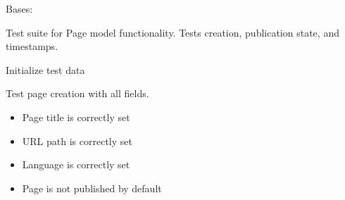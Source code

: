 \documentclass[letterpaper,10pt,english]{sphinxmanual}
\begin{document}
\begin{fulllineitems}
\label{\detokenize{pages_app.tests:pages_app.tests.test_models.PageModelTest}}
\pysigstartsignatures
\pysiglinewithargsret
{}
{}
{}
\pysigstopsignatures
\sphinxAtStartPar
Bases: 

\sphinxAtStartPar
Test suite for Page model functionality.
Tests creation, publication state, and timestamps.

\begin{fulllineitems}
\label{\detokenize{pages_app.tests:pages_app.tests.test_models.PageModelTest.setUp}}
\pysigstartsignatures
\pysiglinewithargsret
{}
{}
{}
\pysigstopsignatures
\sphinxAtStartPar
Initialize test data

\end{fulllineitems}


\begin{fulllineitems}
\label{\detokenize{pages_app.tests:pages_app.tests.test_models.PageModelTest.test_page_creation}}
\pysigstartsignatures
\pysiglinewithargsret
{}
{}
{}
\pysigstopsignatures
\sphinxAtStartPar
Test page creation with all fields.
\begin{description}
\begin{itemize}
\item {} 
\sphinxAtStartPar
Page title is correctly set

\item {} 
\sphinxAtStartPar
URL path is correctly set

\item {} 
\sphinxAtStartPar
Language is correctly set

\item {} 
\sphinxAtStartPar
Page is not published by default


\end{itemize}
\end{description}
\end{fulllineitems}
\end{fulllineitems}
\end{document}
